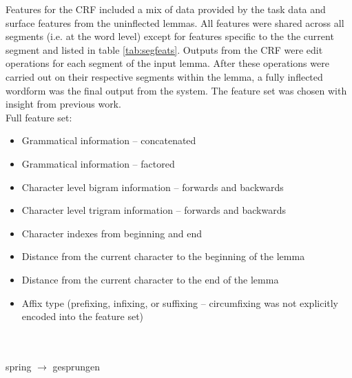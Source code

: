 \documentclass[11pt]{article}
\begin{document}

Features for the CRF included a mix of data provided by the task data and surface features from the uninflected lemmas.
All features were shared across all segments (i.e. at the word level) except for features specific to the the current segment and listed in table \ref{tab:segfeats}.
Outputs from the CRF were edit operations for each segment of the input lemma.
After these operations were carried out on their respective segments within the lemma, a fully inflected wordform was the final output from the system.
The feature set was chosen with insight from previous work.\\

\noindent Full feature set:
	\begin{itemize}
      \item Grammatical information -- concatenated
      \item Grammatical information -- factored
      \item Character level bigram information -- forwards and backwards
      \item Character level trigram information -- forwards and backwards
      \item Character indexes from beginning and end
      \item Distance from the current character to the beginning of the lemma
      \item Distance from the current character to the end of the lemma
      \item Affix type (prefixing, infixing, or suffixing -- circumfixing was not explicitly encoded into the feature set)
  \end{itemize}
\begin{table}
    \\~\\
    spring $\to$ gesprungen
    \caption{An example of character-specific features as used by the CRF -- all other features are shared across the entire edit sequence.}
    \label{tab:segfeats}
\end{table}
\end{document}
